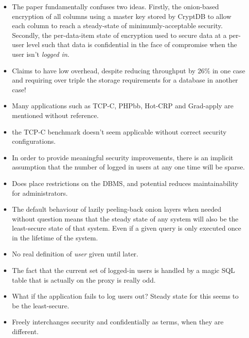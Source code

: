 \documentclass[11pt]{article}
\begin{document}
\begin{itemize}

    \item The paper fundamentally confuses two ideas. Firstly, the onion-based
    encryption of all columns using a master key stored by CryptDB to allow
    each column to reach a steady-state of minimumly-acceptable security.
    Secondly, the per-data-item state of encryption used to secure data at a
    per-user level such that data is confidential in the face of compromise
    when the user isn't \textit{logged in}.

    \item Claims to have low overhead, despite reducing throughput by 26\% in
    one case and requiring over triple the storage requirements for a database
    in another case!

    \item Many applications such as TCP-C, PHPbb, Hot-CRP and Grad-apply are
    mentioned without reference.

    \item the TCP-C benchmark doesn't seem applicable without correct security
    configurations.

    \item In order to provide meaningful security improvements, there is an
    implicit assumption that the number of logged in users at any one time will
    be sparse.

    \item Does place restrictions on the DBMS, and potential reduces
    maintainability for administrators.

    \item The default behaviour of lazily peeling-back onion layers when needed
    without question means that the steady state of any system will also be the
    least-secure state of that system. Even if a given query is only executed
    once in the lifetime of the system.

    \item No real definition of \textit{user} given until later.

    \item The fact that the current set of logged-in users is handled by a
    magic SQL table that is actually on the proxy is really odd.

    \item What if the application fails to log users out? Steady state for this
    seems to be the least-secure.

    \item Freely interchanges security and confidentially as terms, when they
    are different.


\end{itemize}
\end{document}
